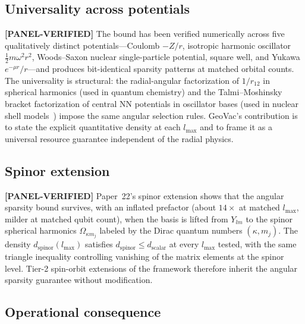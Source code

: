 \documentclass[aps,pra,twocolumn,superscriptaddress,longbibliography]{revtex4-2}
\begin{document}
\subsection*{Universality across potentials}

\textbf{[PANEL-VERIFIED]} The bound has been verified numerically across five qualitatively
distinct potentials---Coulomb $-Z/r$, isotropic harmonic oscillator
$\tfrac{1}{2} m \omega^2 r^2$, Woods--Saxon nuclear single-particle
potential, square well, and Yukawa $e^{-\mu r}/r$---and produces
bit-identical sparsity patterns at matched orbital counts.  The
universality is structural: the radial-angular factorization of
$1/r_{12}$ in spherical harmonics (used in quantum chemistry) and the
Talmi--Moshinsky bracket factorization of central NN potentials in
oscillator bases (used in nuclear shell models~\cite{Suhonen2007}) impose the same
angular selection rules.  GeoVac's contribution is to state the
explicit quantitative density at each $l_{\max}$ and to frame it as a
universal resource guarantee independent of the radial physics.

\subsection*{Spinor extension}

\textbf{[PANEL-VERIFIED]} Paper~22's spinor extension shows that the angular sparsity bound
survives, with an inflated prefactor (about $14\times$ at matched
$l_{\max}$, milder at matched qubit count), when the basis is lifted
from $Y_{lm}$ to the spinor spherical harmonics
$\Omega_{\kappa m_j}$ labeled by the Dirac quantum numbers
$(\kappa, m_j)$.  The density $d_\mathrm{spinor}(l_{\max})$ satisfies
$d_\mathrm{spinor} \le d_\mathrm{scalar}$ at every $l_{\max}$ tested,
with the same triangle inequality controlling vanishing of the
matrix elements at the spinor level.  Tier-2 spin-orbit
extensions of the framework therefore inherit the angular sparsity
guarantee without modification.

\subsection*{Operational consequence}
\end{document}
